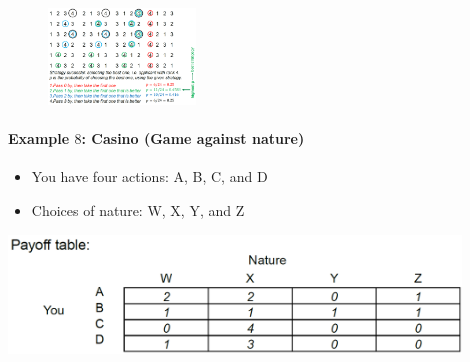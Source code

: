 \begin{figure}[h]
    \centering
    \includegraphics[width=0.35\textwidth]{Pictures/secretary_problem_n_4.png}
\end{figure}

\begin{minipage}{0.45\textwidth}
    \paragraph{Example $8$: Casino (Game against nature)}
    \begin{itemize}
        \item You have four actions: A, B, C, and D
        \item Choices of nature: W, X, Y, and Z
    \end{itemize}
\end{minipage}
\begin{minipage}{0.45\textwidth}
    \includegraphics[width=0.9\textwidth]{Pictures/Payoff_table.png}
\end{minipage}

